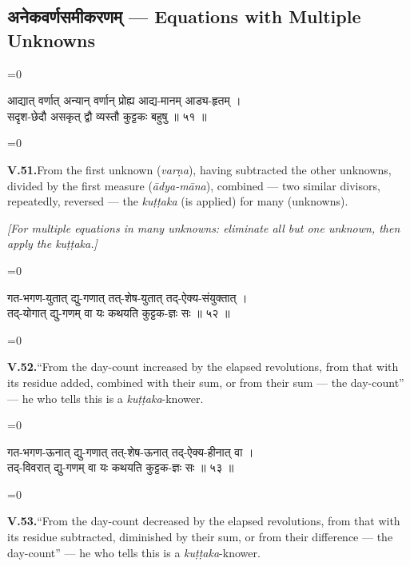 \documentclass[11pt,a4paper]{article}
\newcommand{\dev}[1]{{\devanagarifont\color{sktcolor}#1}}
\newcommand{\iast}[1]{\textit{#1}}
\newenvironment{paracol}[1]{\begingroup}{\endgroup}
\newcommand{\switchcolumn}[1][]{%
  \ifnum#1=0\relax\else\par\nobreak\vspace{0.5em}\par\nobreak\fi%
}
\begin{document}
\subsection*{\dev{अनेकवर्णसमीकरणम् — Equations with Multiple Unknowns}}

\vspace{0.3cm}

\begin{paracol}{2}
\switchcolumn[0]
\dev{%
आद्यात् वर्णात् अन्यान् वर्णान् प्रोह्य आद्य-मानम् आड्य-हृतम् ।\\
सदृश-छेदौ असकृत् द्वौ व्यस्तौ कुट्टकः बहुषु ॥ ५१ ॥
}

\switchcolumn[1]
\textbf{V.51.}\quad From the first unknown (\iast{varṇa}), having
subtracted the other unknowns, divided by the first measure
(\iast{ādya-māna}), combined — two similar divisors, repeatedly,
reversed — the \iast{kuṭṭaka} (is applied) for many (unknowns).

\medskip
\textit{[For multiple equations in many unknowns: eliminate all but
one unknown, then apply the \iast{kuṭṭaka}.]}
\end{paracol}

\vspace{0.3cm}

\begin{paracol}{2}
\switchcolumn[0]
\dev{%
गत-भगण-युतात् द्यु-गणात् तत्-शेष-युतात् तद्-ऐक्य-संयुक्तात् ।\\
तद्-योगात् द्यु-गणम् वा यः कथयति कुट्टक-ज्ञः सः ॥ ५२ ॥
}

\switchcolumn[1]
\textbf{V.52.}\quad ``From the day-count increased by the elapsed
revolutions, from that with its residue added, combined with their
sum, or from their sum — the day-count'' — he who tells this is a
\iast{kuṭṭaka}-knower.
\end{paracol}

\vspace{0.3cm}

\begin{paracol}{2}
\switchcolumn[0]
\dev{%
गत-भगण-ऊनात् द्यु-गणात् तत्-शेष-ऊनात् तद्-ऐक्य-हीनात् वा ।\\
तद्-विवरात् द्यु-गणम् वा यः कथयति कुट्टक-ज्ञः सः ॥ ५३ ॥
}

\switchcolumn[1]
\textbf{V.53.}\quad ``From the day-count decreased by the elapsed
revolutions, from that with its residue subtracted, diminished by
their sum, or from their difference — the day-count'' — he who
tells this is a \iast{kuṭṭaka}-knower.
\end{paracol}
\end{document}

